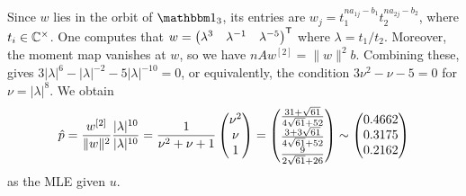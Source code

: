 \begin{example}
	Since $w$ lies in the orbit of $\ones_3$, its entries are $w_j = t_1^{n a_{1j} - b_1} t_2^{n a_{2j} - b_2}$, where $t_i \in \mathbb C^\times$. One computes that
	$w = \begin{pmatrix} \lambda^3 & \lambda^{-1} & \lambda^{-5} \end{pmatrix}^{\mathsf{T}}$ where $\lambda = t_1/t_2$. 
	Moreover, the moment map vanishes at $w$, so we have $n A w^{[2]} = \| w \|^2 b$. Combining these, gives $3 |\lambda|^{6} - |\lambda|^{-2} - 5 |\lambda|^{-10} = 0$, or equivalently, the condition 
	$ 3 \nu^2 - \nu - 5 = 0 $ for $\nu = |\lambda|^{8}$. We obtain
		\[	\hat{p} = \frac{w^{[2]}}{\|w\|^2} \frac{|\lambda|^{10}}{|\lambda|^{10}} = \frac{1}{\nu^2 + \nu + 1}\begin{pmatrix} \nu^2 \\ \nu \\ 1 \end{pmatrix} =\begin{pmatrix}\frac{31+\sqrt{61}}{4 \sqrt{61}+52}\cr \frac{3+3 \sqrt{61}}{4 \sqrt{61}+52}\cr \frac{9}{2 \sqrt{61}+26}\end{pmatrix}
		\sim  \begin{pmatrix} 0.4662 \\ 0.3175 \\ 0.2162 \end{pmatrix} \]
	as the MLE given $u$.
	\hfill\exSymbol
\end{example}


